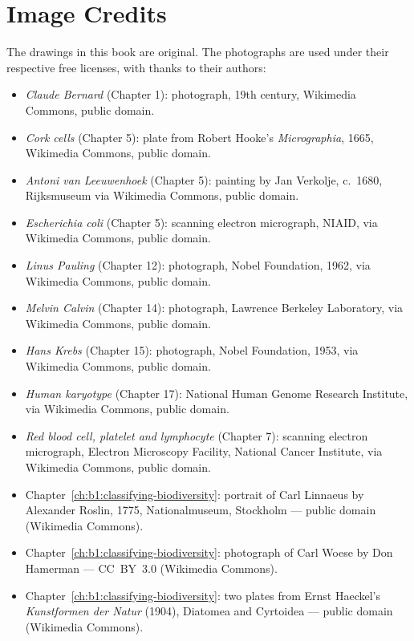 \chapter*{Image Credits}

The drawings in this book are original. The photographs are used
under their respective free licenses, with thanks to their authors:

\begin{itemize}
  \item \emph{Claude Bernard} (Chapter 1): photograph, 19th century,
        Wikimedia Commons, public domain.
  \item \emph{Cork cells} (Chapter 5): plate from Robert Hooke's
        \emph{Micrographia}, 1665, Wikimedia Commons, public domain.
  \item \emph{Antoni van Leeuwenhoek} (Chapter 5): painting by Jan
        Verkolje, c.~1680, Rijksmuseum via Wikimedia Commons, public
        domain.
  \item \emph{Escherichia coli} (Chapter 5): scanning electron
        micrograph, NIAID, via Wikimedia Commons, public domain.
  \item \emph{Linus Pauling} (Chapter 12): photograph, Nobel Foundation,
        1962, via Wikimedia Commons, public domain.
  \item \emph{Melvin Calvin} (Chapter 14): photograph, Lawrence Berkeley
        Laboratory, via Wikimedia Commons, public domain.
  \item \emph{Hans Krebs} (Chapter 15): photograph, Nobel Foundation,
        1953, via Wikimedia Commons, public domain.
  \item \emph{Human karyotype} (Chapter 17): National Human Genome
        Research Institute, via Wikimedia Commons, public domain.
  \item \emph{Red blood cell, platelet and lymphocyte} (Chapter 7):
        scanning electron micrograph, Electron Microscopy Facility,
        National Cancer Institute, via Wikimedia Commons, public
        domain.
  \item Chapter~\ref{ch:b1:classifying-biodiversity}: portrait of Carl Linnaeus by Alexander Roslin, 1775, Nationalmuseum, Stockholm --- public domain (Wikimedia Commons).
  \item Chapter~\ref{ch:b1:classifying-biodiversity}: photograph of Carl Woese by Don Hamerman --- CC~BY~3.0 (Wikimedia Commons).
  \item Chapter~\ref{ch:b1:classifying-biodiversity}: two plates from Ernst Haeckel's \emph{Kunstformen der Natur} (1904), Diatomea and Cyrtoidea --- public domain (Wikimedia Commons).
\end{itemize}

